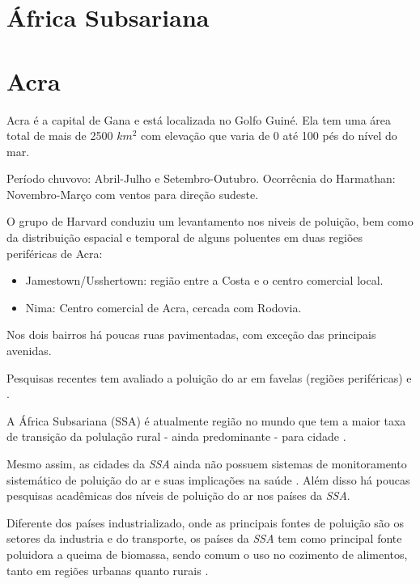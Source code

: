 \section{África Subsariana}

\section{Acra}

Acra é a capital  de Gana e está localizada no Golfo Guiné. Ela tem uma área 
total de mais de 2500 $km^2$ com elevação que varia de 0 até 100 pés do nível 
do mar. 

Período chuvovo: Abril-Julho e Setembro-Outubro. 
Ocorrêcnia do Harmathan: Novembro-Março com ventos para direção sudeste.

O grupo de Harvard \citep{ARKU2008} conduziu um levantamento nos niveis de 
poluição, bem como da distribuição espacial e temporal de alguns poluentes 
em duas regiões periféricas de Acra: 

\begin{itemize}
  \item Jamestown/Usshertown: região entre a Costa e o centro comercial local.
  \item Nima: Centro comercial de Acra, cercada com Rodovia.
\end{itemize} 

Nos dois bairros há poucas ruas pavimentadas, com exceção das principais 
avenidas. 

Pesquisas recentes tem avaliado a poluição do ar em favelas 
(regiões periféricas) \citep{SCLAR2005} e \citep{RILEY2007}. 

A África Subsariana (SSA) é atualmente região no mundo que tem a maior taxa de 
transição da polulação rural - ainda predominante - para cidade 
\citep{MONTGOMERY2008}.

Mesmo assim, as cidades da \textit{SSA} ainda não possuem sistemas de 
monitoramento sistemático de poluição do ar e suas implicações na saúde 
\citep{EZZATI2004}. 
Além disso há poucas pesquisas acadêmicas dos níveis de poluição do ar nos 
países da \textit{SSA}.

Diferente dos países industrializado, onde as principais fontes de poluição 
são os setores da industria e do transporte, os países da \textit{SSA} tem como 
principal fonte poluidora a queima de biomassa, sendo comum o uso no cozimento 
de alimentos, tanto em regiões urbanas quanto rurais \citep{SMITH2004}.
